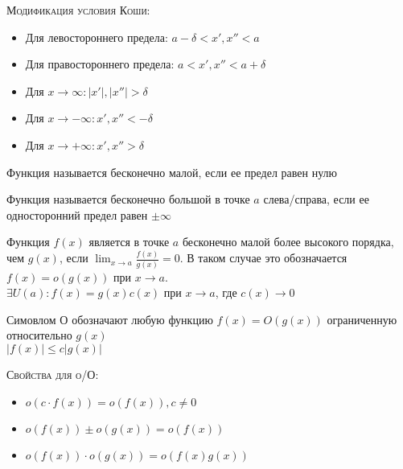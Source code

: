 \documentclass[14pt]{extreport}
\begin{document}
            
            \textsc{Модификация условия Коши}:
            \begin{itemize}
                \item Для левостороннего предела: $a-\delta < x', x'' < a$
                \item Для правостороннего предела: $a < x', x'' < a+\delta$
                \item Для $x\rightarrow \infty: |x'|, |x''| > \delta$ 
                \item Для $x\rightarrow -\infty: x', x'' <  -\delta$ 
                \item Для $x\rightarrow +\infty: x', x'' > \delta$ 
            \end{itemize}

        
            \begin{definition}
                Функция называется бесконечно малой, если ее предел равен нулю
            \end{definition}
            \begin{definition}
                Функция называется бесконечно большой в точке $a$ слева/справа, если ее односторонний предел равен $\pm \infty$
            \end{definition}

            \begin{definition}
                Функция $f(x)$ является в точке $a$ бесконечно малой более высокого порядка, чем $g(x)$, если $\lim_{x\rightarrow a}\frac{f(x)}{g(x)} = 0$. В таком случае это обозначается $f(x) = o(g(x)) $ при $x \rightarrow a$. \\ 
                $\exists U(a) : f(x) = g(x)c(x)$ при $x\rightarrow a$, где $c(x) \rightarrow 0$
            \end{definition} 

            \begin{definition}
                Симовлом О обозначают любую функцию $f(x) = O(g(x))$ ограниченную относительно $g(x)$ \\ 
                $|f(x)| \leq c |g(x)|$
            \end{definition}

            \textsc{Свойства для о/О:}
                \begin{itemize}
                    \item $o(c\cdot f(x)) = o(f(x)), c\neq 0$
                    \item $o(f(x)) \pm o(g(x)) = o(f(x))$
                    \item $o(f(x)) \cdot o(g(x)) = o(f(x)g(x))$
                \end{itemize}
\end{document}
